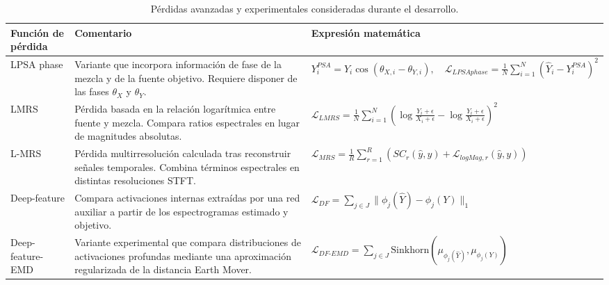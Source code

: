 \begin{table}[H]
    \centering
    \small
    \begin{adjustbox}{max width=\textwidth}
        \begin{tabular}{p{} p{} p{}}
            \toprule
            \textbf{Función de pérdida} & \textbf{Comentario} & \textbf{Expresión matemática} \\
            \midrule

            LPSA phase &
            Variante que incorpora información de fase de la mezcla y de la fuente objetivo. Requiere disponer de las fases \(\theta_X\) y \(\theta_Y\). &
            \( Y^{PSA}_i = Y_i \cos(\theta_{X,i}-\theta_{Y,i}), \quad \mathcal{L}_{LPSAphase} = \frac{1}{N}\sum_{i=1}^{N}(\hat{Y}_i-Y^{PSA}_i)^2 \)
            \\

            LMRS &
            Pérdida basada en la relación logarítmica entre fuente y mezcla. Compara ratios espectrales en lugar de magnitudes absolutas. &
            \( \mathcal{L}_{LMRS} = \frac{1}{N}\sum_{i=1}^{N}\left(\log\frac{Y_i+\epsilon}{X_i+\epsilon}-\log\frac{\hat{Y}_i+\epsilon}{X_i+\epsilon}\right)^2 \)
            \\

            L-MRS &
            Pérdida multirresolución calculada tras reconstruir señales temporales. Combina términos espectrales en distintas resoluciones STFT. &
            \( \mathcal{L}_{MRS} = \frac{1}{R}\sum_{r=1}^{R}\left(SC_r(\hat{y},y)+\mathcal{L}_{logMag,r}(\hat{y},y)\right) \)
            \\

            Deep-feature &
            Compara activaciones internas extraídas por una red auxiliar a partir de los espectrogramas estimado y objetivo. &
            \( \mathcal{L}_{DF} = \sum_{j \in J}\|\phi_j(\hat{Y})-\phi_j(Y)\|_1 \)
            \\

            Deep-feature-EMD &
            Variante experimental que compara distribuciones de activaciones profundas mediante una aproximación regularizada de la distancia Earth Mover. &
            \( \mathcal{L}_{DF\text{-}EMD} = \sum_{j \in J}\mathrm{Sinkhorn}\left(\mu_{\phi_j(\hat{Y})},\mu_{\phi_j(Y)}\right) \)
            \\

            \bottomrule
        \end{tabular}
    \end{adjustbox}
    \caption{Pérdidas avanzadas y experimentales consideradas durante el desarrollo.}
    \label{tab:perdidas-avanzadas}
\end{table}

